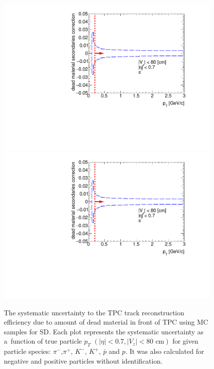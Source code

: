 \begin{figure}[hb]
	\caption[The systematic uncertainty to the TPC track reconstruction efficiency due to  amount of dead material in front of TPC using MC samples for SD]{The systematic uncertainty to the TPC track reconstruction efficiency due to  amount of dead material in front of TPC using MC samples for SD. Each plot represents the systematic uncertainty as a~function of true particle $p_T$ $\left(|\eta|<0.7, |V_{z}|<80 \text{ cm}\right)$ for given particle species: $\pi^-$,$\pi^+$, $K^-$, $K^+$, $\bar{p}$ and $p$. It was also calculated for negative and positive particles without identification.}\label{fig:dead_materialSD1D}
	\centering
	\parbox{0.495\textwidth}{
		\centering
		\includegraphics[width=\linewidth,page=1]{graphics/systematicsEfficiency/deadMaterial/secondaries_Unbinned_SD_1D.pdf}\\
		\includegraphics[width=\linewidth,page=2]{graphics/systematicsEfficiency/deadMaterial/secondaries_Unbinned_SD_1D.pdf}\\
}
\end{figure}
